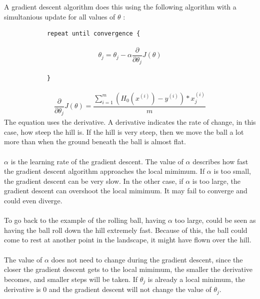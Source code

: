 \noindent A gradient descent algorithm does this using the following algorithm with a simultanious update for all values of $\theta$ \cite{stanford}:
\begin{lstlisting}
            repeat until convergence {
 \end{lstlisting}
\begin{align}
    \theta_j = \theta_j - \alpha\dfrac{\partial}{\partial \theta_j}J(\theta)
\end{align}
\begin{lstlisting}
            }
 \end{lstlisting}
\begin{align}
\dfrac{\partial}{\partial \theta_j}J(\theta) =  \dfrac{\sum\limits_{i=1}^m(H_0(x^{(i)}) - y^{(i)}) * x_j^{(i)}}{m}
 \end{align}
 The equation uses the derivative. A derivative indicates the rate of change, in this case, how steep the hill is. If the hill is very steep, then we move the ball a lot more than when the ground beneath the ball is almost flat.\\\\
 $\alpha$ is the learning rate of the gradient descent. The value of $\alpha$ describes how fast the gradient descent algorithm approaches the local mimimum. If $\alpha$ is too small, the gradient descent can be very slow. In the other case, if $\alpha$ is too large, the gradient descent can overshoot the local mimimum. It may fail to converge and could even diverge. \\\\ 
To go back to the example of the rolling ball, having $\alpha$ too large, could be seen as having the ball roll down the hill extremely fast. Because of this, the ball could come to rest at another point in the landscape, it might have flown over the hill. \\
 \\
The value of $\alpha$ does not need to change during the gradient descent, since the closer the gradient descent gets to the local mimimum, the smaller the derivative becomes, and smaller steps will be taken. If $\theta_j$ is already a local minimum, the derivative is $0$ and the gradient descent will not change the value of $\theta_j$.

